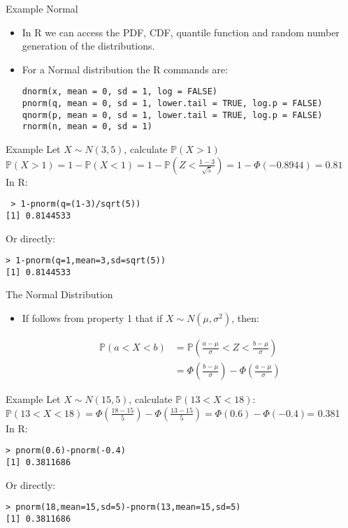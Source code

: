\documentclass[handout]{beamer}
\begin{document}
\begin{frame}[fragile]{Example Normal}
\scriptsize{
\begin{itemize}
 \item In R we can access the PDF, CDF, quantile function and random number generation of the distributions.
 \item For a Normal distribution the R commands are:
\begin{verbatim}
dnorm(x, mean = 0, sd = 1, log = FALSE)
pnorm(q, mean = 0, sd = 1, lower.tail = TRUE, log.p = FALSE)
qnorm(p, mean = 0, sd = 1, lower.tail = TRUE, log.p = FALSE)
rnorm(n, mean = 0, sd = 1) 
\end{verbatim}
 
\end{itemize}

\begin{block}{Example}
Let $X\sim N(3,5)$, calculate $\mathbb{P}(X > 1)$ \\
$\mathbb{P}(X >1) = 1-\mathbb{P}(X<1) = 1-\mathbb{P}(Z < \frac{1-3}{\sqrt{5}})=1-\Phi(-0.8944)= 0.81$ \\
In R:
\begin{verbatim}
 > 1-pnorm(q=(1-3)/sqrt(5))
[1] 0.8144533
\end{verbatim}
Or directly:
\begin{verbatim}
> 1-pnorm(q=1,mean=3,sd=sqrt(5))
[1] 0.8144533 
\end{verbatim}
\end{block}
}
\end{frame}



\begin{frame}[fragile]{The  Normal Distribution}

\scriptsize{
\begin{itemize}
 \item If follows from property 1 that if $X\sim N(\mu,\sigma^2)$, then:
 
 \begin{align}
  \mathbb{P}(a<X<b) & = \mathbb{P}\left(\frac{a-\mu}{\sigma}<Z<\frac{b-\mu}{\sigma}\right) \\
   & = \Phi \left(\frac{b-\mu}{\sigma}\right)-\Phi \left(\frac{a-\mu}{\sigma}\right)
 \end{align}

 
\end{itemize}

\begin{block}{Example}
Let $X\sim N(15,5)$, calculate $\mathbb{P}(13<X<18)$: \\
$\mathbb{P}(13<X<18)=\Phi \left(\frac{18-15}{5}\right)-\Phi \left(\frac{13-15}{5}\right)=\Phi(0.6)-\Phi(-0.4)$= 0.381\\
In R:
\begin{verbatim}
> pnorm(0.6)-pnorm(-0.4)
[1] 0.3811686
\end{verbatim}
Or directly:
\begin{verbatim}
> pnorm(18,mean=15,sd=5)-pnorm(13,mean=15,sd=5)
[1] 0.3811686
\end{verbatim}
\end{block}


}
\end{frame}
\end{document}
